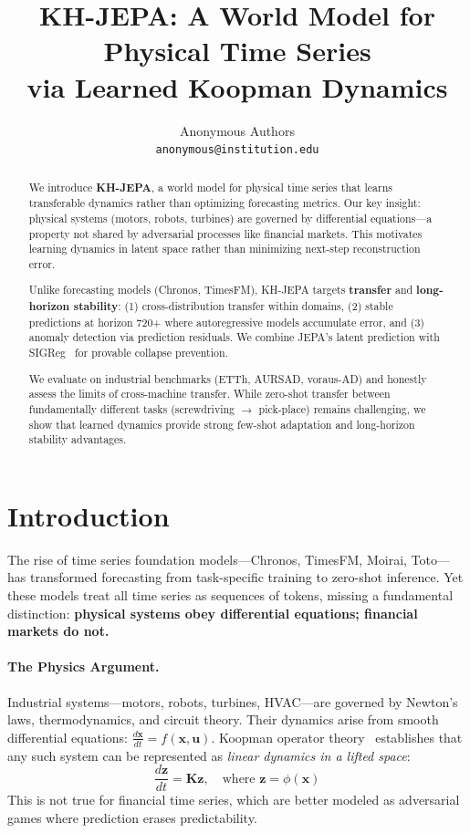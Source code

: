 \documentclass{article}
\title{KH-JEPA: A World Model for Physical Time Series\\via Learned Koopman Dynamics}
\author{
  Anonymous Authors \\
  \texttt{anonymous@institution.edu}
}
\begin{document}
\maketitle

\begin{abstract}
We introduce \textbf{KH-JEPA}, a world model for physical time series that learns transferable dynamics rather than optimizing forecasting metrics. Our key insight: physical systems (motors, robots, turbines) are governed by differential equations—a property not shared by adversarial processes like financial markets. This motivates learning dynamics in latent space rather than minimizing next-step reconstruction error.

Unlike forecasting models (Chronos, TimesFM), KH-JEPA targets \textbf{transfer} and \textbf{long-horizon stability}: (1) cross-distribution transfer within domains, (2) stable predictions at horizon 720+ where autoregressive models accumulate error, and (3) anomaly detection via prediction residuals. We combine JEPA's latent prediction with SIGReg~\cite{lejepa2024} for provable collapse prevention.

We evaluate on industrial benchmarks (ETTh, AURSAD, voraus-AD) and honestly assess the limits of cross-machine transfer. While zero-shot transfer between fundamentally different tasks (screwdriving $\rightarrow$ pick-place) remains challenging, we show that learned dynamics provide strong few-shot adaptation and long-horizon stability advantages.
\end{abstract}

\section{Introduction}

The rise of time series foundation models—Chronos, TimesFM, Moirai, Toto—has transformed forecasting from task-specific training to zero-shot inference. Yet these models treat all time series as sequences of tokens, missing a fundamental distinction: \textbf{physical systems obey differential equations; financial markets do not.}

\paragraph{The Physics Argument.} Industrial systems—motors, robots, turbines, HVAC—are governed by Newton's laws, thermodynamics, and circuit theory. Their dynamics arise from smooth differential equations: $\frac{d\mathbf{x}}{dt} = f(\mathbf{x}, \mathbf{u})$. Koopman operator theory~\cite{koopman1931,brunton2021modern} establishes that any such system can be represented as \emph{linear dynamics in a lifted space}:
\begin{equation}
    \frac{d\mathbf{z}}{dt} = \mathbf{K} \mathbf{z}, \quad \text{where } \mathbf{z} = \phi(\mathbf{x})
\end{equation}
This is not true for financial time series, which are better modeled as adversarial games where prediction erases predictability.
\end{document}
